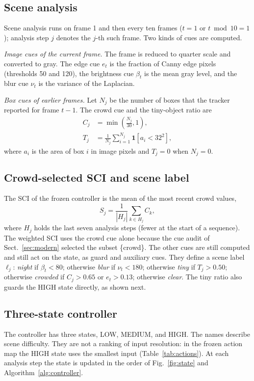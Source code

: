 \subsection{Scene analysis}
Scene analysis runs on frame 1 and then every ten frames ($t=1$ or
$t \bmod 10 = 1$); analysis step $j$ denotes the $j$-th such frame. Two kinds
of cues are computed.

\emph{Image cues of the current frame.} The frame is reduced to quarter scale
and converted to gray. The edge cue $e_t$ is the fraction of Canny edge pixels
(thresholds 50 and 120), the brightness cue $\beta_t$ is the mean gray level,
and the blur cue $\nu_t$ is the variance of the Laplacian.

\emph{Box cues of earlier frames.} Let $N_j$ be the number of boxes that the
tracker reported for frame $t-1$. The crowd cue and the tiny-object ratio are
\begin{align}
C_j&=\min\!\left(\frac{N_j}{30},1\right),\label{eq:crowd}\\
T_j&=\frac{1}{N_j}\sum_{i=1}^{N_j}\mathbf{1}\!\left[a_i<32^2\right],\label{eq:tiny}
\end{align}
where $a_i$ is the area of box $i$ in image pixels and $T_j=0$ when $N_j=0$.

\subsection{Crowd-selected SCI and scene label}
The SCI of the frozen controller is the mean of the most recent crowd values,
\begin{equation}
S_j=\frac{1}{|H_j|}\sum_{k\in H_j} C_k,
\label{eq:sci}
\end{equation}
where $H_j$ holds the last seven analysis steps (fewer at the start of a
sequence). The weighted SCI uses the crowd cue alone because the cue audit of
Sect.~\ref{sec:modern} selected the subset \{crowd\}. The other cues are still
computed and still act on the state, as guard and auxiliary cues. They define
a scene label $\ell_j$:
\emph{night} if $\beta_t<80$; otherwise \emph{blur} if $\nu_t<180$; otherwise
\emph{tiny} if $T_j>0.50$; otherwise \emph{crowded} if $C_j>0.65$ or
$e_t>0.13$; otherwise \emph{clear}. The tiny ratio also guards the HIGH state
directly, as shown next.

\subsection{Three-state controller}
The controller has three states, LOW, MEDIUM, and HIGH. The names describe
scene difficulty. They are not a ranking of input resolution: in the frozen
action map the HIGH state uses the smallest input (Table~\ref{tab:actions}).
At each analysis step the state is updated in the order of
Fig.~\ref{fig:state} and Algorithm~\ref{alg:controller}.

